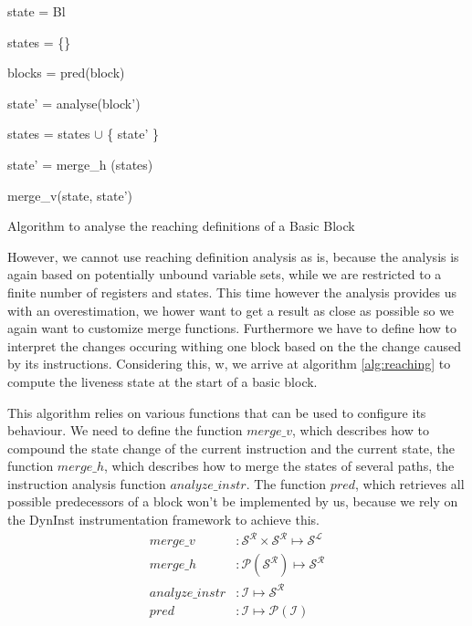 \begin{algorithm}[!h]
	\SetAlgoLined
	{
 	state = Bl
 	

	states = \{\}
	
	blocks = pred(block)
	
	 {
	
 		state' = analyse(block')
 		
		states = states $\cup$ \{ state' \}
	}

	state' = merge\_h (states)

	\Return merge\_v(state, state')

	}
\caption{Algorithm to analyse the reaching definitions of a Basic Block}
\label{alg:reaching}
\end{algorithm}

However, we cannot use reaching definition analysis as is, because the analysis is again based on potentially unbound variable sets, while we are restricted to a finite number of registers and states. This time however the analysis provides us with an overestimation, we hower want to get a result as close as possible so we again want to customize merge functions. Furthermore we have to define how to interpret the changes occuring withing one block based on the the change caused by its instructions. Considering this, w, we arrive at algorithm \ref{alg:reaching} to compute the liveness state at the start of a basic block.

This algorithm relies on various functions that can be used to configure its behaviour. We need to define the function $merge\_v$, which describes how to compound the state change of the current instruction and the current state, the function $merge\_h$, which describes how to merge the states of several paths, the instruction analysis function $analyze\_instr$. The function $pred$, which retrieves all possible predecessors of a block won't be implemented by us, because we rely on the DynInst instrumentation framework to achieve this.
\begin{subequations}
\label{eq:livenesscustom}
\begin{align}
merge\_v &: \mathcal{S}^\mathcal{R} \times \mathcal{S}^\mathcal{R} \mapsto \mathcal{S}^\mathcal{L}\\
merge\_h &: \mathcal{P}(\mathcal{S}^\mathcal{R}) \mapsto \mathcal{S}^\mathcal{R}\\
analyze\_instr &: \mathcal {I} \mapsto \mathcal{S}^\mathcal{R} \\
pred &: \mathcal{I} \mapsto \mathcal{P}(\mathcal{I})
\end{align}
\end{subequations}

